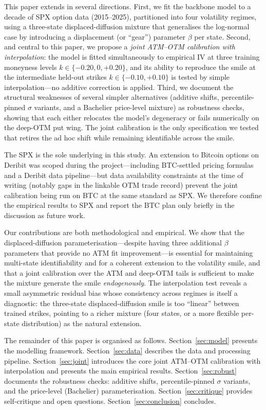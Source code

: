 \documentclass[12pt]{article}
\begin{document}
This paper extends \citet{A2004} in several directions. First, we fit the backbone model to a decade of SPX option data (2015--2025), partitioned into four volatility regimes, using a three-state displaced-diffusion mixture that generalises the log-normal case by introducing a displacement (or ``gear'') parameter $\beta$ per state. Second, and central to this paper, we propose a \emph{joint ATM--OTM calibration with interpolation}: the model is fitted simultaneously to empirical IV at three training moneyness levels $k \in \{-0.20, 0, +0.20\}$, and its ability to reproduce the smile at the intermediate held-out strikes $k \in \{-0.10, +0.10\}$ is tested by simple interpolation---no additive correction is applied. Third, we document the structural weaknesses of several simpler alternatives (additive shifts, percentile-pinned $\sigma$ variants, and a Bachelier price-level mixture) as robustness checks, showing that each either relocates the model's degeneracy or fails numerically on the deep-OTM put wing. The joint calibration is the only specification we tested that retires the ad hoc shift while remaining identifiable across the smile.

The SPX is the sole underlying in this study. An extension to Bitcoin options on Deribit was scoped during the project---including BTC-settled pricing formulas and a Deribit data pipeline---but data availability constraints at the time of writing (notably gaps in the linkable OTM trade record) prevent the joint calibration being run on BTC at the same standard as SPX. We therefore confine the empirical results to SPX and report the BTC plan only briefly in the discussion as future work.

Our contributions are both methodological and empirical. We show that the displaced-diffusion parameterisation---despite having three additional $\beta$ parameters that provide no ATM fit improvement---is essential for maintaining multi-state identifiability and for a coherent extension to the volatility smile, and that a joint calibration over the ATM and deep-OTM tails is sufficient to make the mixture generate the smile \emph{endogenously}. The interpolation test reveals a small asymmetric residual bias whose consistency across regimes is itself a diagnostic: the three-state displaced-diffusion smile is too ``linear'' between trained strikes, pointing to a richer mixture (four states, or a more flexible per-state distribution) as the natural extension.

The remainder of this paper is organised as follows. Section~\ref{sec:model} presents the modelling framework. Section~\ref{sec:data} describes the data and processing pipeline. Section~\ref{sec:joint} introduces the core joint ATM--OTM calibration with interpolation and presents the main empirical results. Section~\ref{sec:robust} documents the robustness checks: additive shifts, percentile-pinned $\sigma$ variants, and the price-level (Bachelier) parameterisation. Section~\ref{sec:critique} provides self-critique and open questions. Section~\ref{sec:conclusion} concludes.
\end{document}
